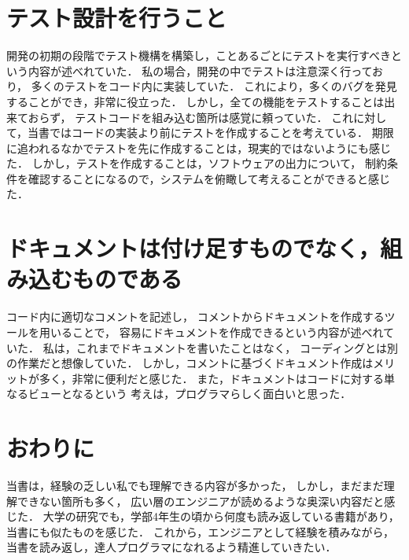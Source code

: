 \documentclass[10pt,oneside,a4paper,twocolumn,platex,dvipdfmx]{jarticle}
\begin{document}
\section{テスト設計を行うこと}
開発の初期の段階でテスト機構を構築し，ことあるごとにテストを実行すべきという内容が述べれていた．
私の場合，開発の中でテストは注意深く行っており，
多くのテストをコード内に実装していた．
これにより，多くのバグを発見することができ，非常に役立った．
しかし，全ての機能をテストすることは出来ておらず，
テストコードを組み込む箇所は感覚に頼っていた．
これに対して，当書ではコードの実装より前にテストを作成することを考えている．
期限に追われるなかでテストを先に作成することは，現実的ではないようにも感じた．
しかし，テストを作成することは，ソフトウェアの出力について，
制約条件を確認することになるので，システムを俯瞰して考えることができると感じた．

\section{ドキュメントは付け足すものでなく，組み込むものである}
コード内に適切なコメントを記述し，
コメントからドキュメントを作成するツールを用いることで，
容易にドキュメントを作成できるという内容が述べれていた．
私は，これまでドキュメントを書いたことはなく，
コーディングとは別の作業だと想像していた．
しかし，コメントに基づくドキュメント作成はメリットが多く，非常に便利だと感じた．
また，ドキュメントはコードに対する単なるビューとなるという
考えは，プログラマらしく面白いと思った．

\section{おわりに}
当書は，経験の乏しい私でも理解できる内容が多かった，
しかし，まだまだ理解できない箇所も多く，
広い層のエンジニアが読めるような奥深い内容だと感じた．
大学の研究でも，学部4年生の頃から何度も読み返している書籍があり，
当書にも似たものを感じた．
これから，エンジニアとして経験を積みながら，
当書を読み返し，達人プログラマになれるよう精進していきたい．
\end{document}
